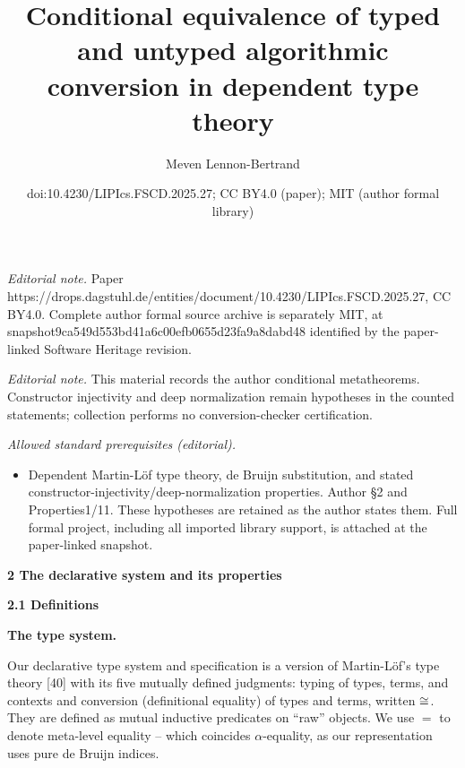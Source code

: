 \documentclass[10pt,a4paper]{amsart}
\title{Conditional equivalence of typed and untyped algorithmic conversion in dependent type theory}
\author{Meven Lennon-Bertrand}
\date{doi:10.4230/LIPIcs.FSCD.2025.27; CC BY4.0 (paper); MIT (author formal library)}
\begin{document}
\maketitle
\noindent\textit{Editorial note.} Paper https://drops.dagstuhl.de/entities/document/10.4230/LIPIcs.FSCD.2025.27, CC BY4.0. Complete author formal source archive is separately MIT, at snapshot9ca549d553bd41a6c00efb0655d23fa9a8dabd48 identified by the paper-linked Software Heritage revision.\par\medskip
\noindent\textit{Editorial note.} This material records the author conditional metatheorems. Constructor injectivity and deep normalization remain hypotheses in the counted statements; collection performs no conversion-checker certification.\par\medskip
\noindent\textit{Allowed standard prerequisites (editorial).}\begin{itemize}
\item Dependent Martin-Löf type theory, de Bruijn substitution, and stated constructor-injectivity/deep-normalization properties. Author §2 and Properties1/11. These hypotheses are retained as the author states them. Full formal project, including all imported library support, is attached at the paper-linked snapshot.
\end{itemize}\medskip
 
\par\medskip\noindent\textbf{2 The declarative system and its properties}\par
 
 
\par\medskip\noindent\textbf{2.1 Definitions}\par
 
 
\par\medskip\noindent\textbf{The type system.}\par
 
 
Our declarative type system and specification is a version of Martin-Löf’s type theory [40] with its five mutually defined judgments: typing of types, terms, and contexts and conversion (definitional equality) of types and terms, written $\mathrel{\raisebox{-0.5pt}{$\cong$}}$. They are defined as mutual inductive predicates on “raw” objects. We use $=$ to denote meta-level equality – which coincides $\alpha$-equality, as our representation uses pure de Bruijn indices.\par
 
\end{document}
